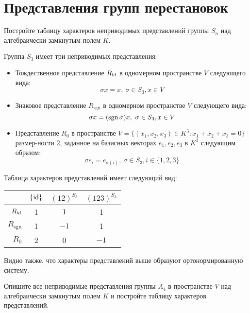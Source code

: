 \section{Представления групп перестановок}

\begin{problem}
	Постройте таблицу характеров неприводимых представлений группы $S_n$ над алгебраически замкнутым полем $K$.
\end{problem}

\begin{solution}
	Группа $S_3$ имеет три неприводимых представления:
	\begin{itemize}
		\item Тождественное представление $R_{\mathrm{id}}$ в одномерном пространстве $V$ следующего вида:
		\[\sigma x = x,~\sigma \in S_3, x \in V\]
		
		\item Знаковое представление $R_{\mathrm{sgn}}$ в одномерном пространстве $V$ следующего вида:
		\[\sigma x = (\operatorname{sgn}\sigma)x,~\sigma \in S_3, x \in V\]
		
		\item Представление $R_0$ в пространстве $V = \{(x_1, x_2, x_3) \in K^3 : x_1 + x_2 + x_3 = 0\}$ размер-ности $2$, заданное на базисных векторах $e_1, e_2, e_3$ в $K^3$ следующим образом:
		\[\sigma e_i = e_{\sigma(i)},~\sigma \in S_3, i \in \{1, 2, 3\}\]
	\end{itemize}
	
	Таблица характеров представлений имеет следующий вид:
	\begin{center}
		\begin{tabular}{r|c|c|c}
			& $\{\mathrm{id}\}$ & $(12)^{S_3}$ & $(123)^{S_3}$ \\ \hline
			$R_{\mathrm{id}}$ &     1     &     $1$      &       1       \\
			$R_{\mathrm{sgn}}$ &     1     &     $-1$     &       1       \\ 
			$R_0$ &     2     &      0       &     $-1$
		\end{tabular}
	\end{center}
	
	Видно также, что характеры представлений выше образуют ортонормированную систему.
\end{solution}

\begin{problem}
	Опишите все неприводимые представления группы $A_4$ в пространстве $V$ над алгебраически замкнутым полем $K$ и постройте таблицу характеров представлений.
\end{problem}

